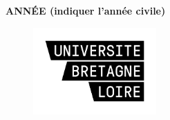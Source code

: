 \documentclass[10pt]{book}
\begin{document}



\newlength{\plarg}
\setlength{\plarg}{8cm}
\newlength{\glarg}
\setlength{\glarg}{14cm}
\newlength{\Glarg}
\setlength{\Glarg}{15cm}

\begin{titlepage}
\thispagestyle{empty}

\vspace{-1cm}
\begin{minipage}{\glarg}
\vspace{-4.5cm}
{\color{gris}\large\hfill \bf ANN\'EE (indiquer l'ann\'ee civile)}
\end{minipage}
\vspace{-2cm}
\begin{figure}[htp]
\hfill\includegraphics[angle=0,width=47mm]{ubl.jpg}
\end{figure}


\end{titlepage}
\end{document}
